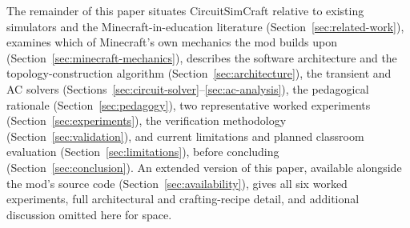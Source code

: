 The remainder of this paper situates CircuitSimCraft relative to existing simulators and the
Minecraft-in-education literature (Section~\ref{sec:related-work}), examines which of
Minecraft's own mechanics the mod builds upon (Section~\ref{sec:minecraft-mechanics}),
describes the software architecture and the topology-construction algorithm
(Section~\ref{sec:architecture}), the transient and AC solvers
(Sections~\ref{sec:circuit-solver}--\ref{sec:ac-analysis}), the pedagogical rationale
(Section~\ref{sec:pedagogy}), two representative worked experiments
(Section~\ref{sec:experiments}), the verification methodology
(Section~\ref{sec:validation}), and current limitations and planned classroom evaluation
(Section~\ref{sec:limitations}), before concluding (Section~\ref{sec:conclusion}). An
extended version of this paper, available alongside the mod's source code
(Section~\ref{sec:availability}), gives all six worked experiments, full architectural and
crafting-recipe detail, and additional discussion omitted here for space.
